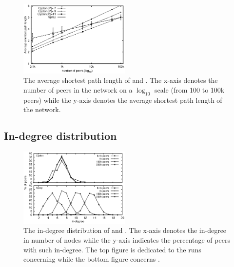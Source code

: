 \begin{figure}
  \centering
  \includegraphics[width=0.49\textwidth]{img/avgpath.eps}
  \caption{\label{fig:avgpath}The average shortest path length of \SPRAY and
    \CYCLON. The x-axis denotes the number of peers in the network on a
    $\log_{10}$ scale (from 100 to 100k peers) while the y-axis denotes the
    average shortest path length of the network.}
\end{figure}

\subsection{In-degree distribution}
\label{subsec:dist}

\begin{figure}
  \centering
  \includegraphics[width=0.49\textwidth]{img/histo.eps}
  \caption{\label{fig:histo}The in-degree distribution of \CYCLON and
    \SPRAY. The x-axis denotes the in-degree in number of nodes while the
    y-axis indicates the percentage of peers with such in-degree. The top
    figure is dedicated to the runs concerning \CYCLON while the bottom figure
    concerns \SPRAY.}
\end{figure}


